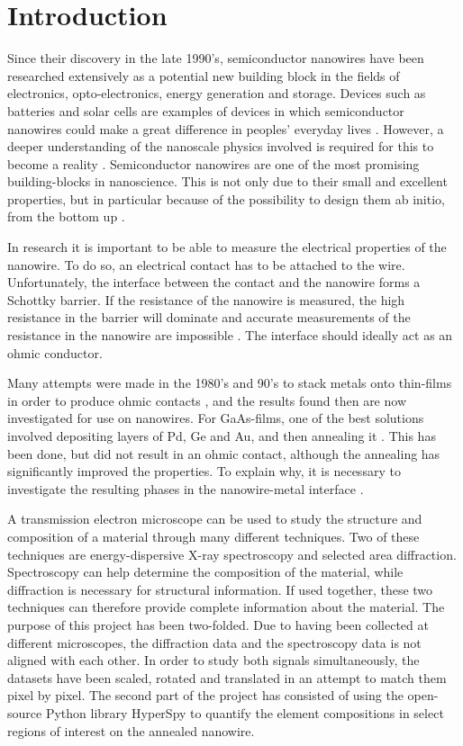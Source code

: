 \chapter{Introduction}

Since their discovery in the late 1990's, semiconductor nanowires have been researched extensively as a potential new building block in the fields of electronics, opto-electronics, energy generation and storage. Devices such as batteries and solar cells are examples of devices in which semiconductor nanowires could make a great difference in peoples' everyday lives \cite{WeiLu}. However, a deeper understanding of the nanoscale physics involved is required for this to become a reality \cite{nanowire-paper}. Semiconductor nanowires are one of the most promising building-blocks in nanoscience. This is not only due to their small and excellent properties, but in particular because of the possibility to design them ab initio, from the bottom up \cite{Lieber}.


In research it is important to be able to measure the electrical properties of the nanowire. To do so, an electrical contact has to be attached to the wire. Unfortunately, the interface between the contact and the nanowire forms a Schottky barrier. If the resistance of the nanowire is measured, the high resistance in the barrier will dominate and accurate measurements of the resistance in the nanowire are impossible \cite{Julie-pres}. The interface should ideally act as an ohmic conductor.

Many attempts were made in the 1980's and 90's to stack metals onto thin-films in order to produce ohmic contacts \cite{Baca}, and the results found then are now investigated for use on nanowires. For GaAs-films, one of the best solutions involved depositing layers of Pd, Ge and Au, and then annealing it \cite{nanowire-paper}. This has been done, but did not result in an ohmic contact, although the annealing has significantly improved the properties. To explain why, it is necessary to investigate the resulting phases in the nanowire-metal interface \cite{Julie-pres}.

A transmission electron microscope can be used to study the structure and composition of a material through many different techniques. Two of these techniques are energy-dispersive X-ray spectroscopy and selected area diffraction. Spectroscopy can help determine the composition of the material, while diffraction is necessary for structural information. If used together, these two techniques can therefore provide complete information about the material. The purpose of this project has been two-folded. Due to having been collected at different microscopes, the diffraction data and the spectroscopy data is not aligned with each other. In order to study both signals simultaneously, the datasets have been scaled, rotated and translated in an attempt to match them pixel by pixel. The second part of the project has consisted of using the open-source Python library HyperSpy \cite{hyperspy} to quantify the element compositions in select regions of interest on the annealed nanowire.

